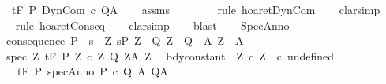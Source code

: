 \begin{isabellebody}
\ \ \ {\isachardoublequoteopen}{\isasymGamma}{\isacharcomma}{\isasymTheta}{\isasymturnstile}\isactrlsub t\isactrlbsub {\isacharslash}F\ \isactrlesub P\ DynCom\ c\ Q{\isacharcomma}A{\isachardoublequoteclose}\isanewline
%
\isadelimproof
\ \ %
\endisadelimproof
%
\isatagproof
{}\isamarkupfalse%
\ assms\isanewline
\ \ \isamarkupfalse%
\ {\isacharminus}\isanewline
\ \ \isamarkupfalse%
\ {\isacharparenleft}rule\ hoaret{\isachardot}DynCom{\isacharparenright}\isanewline
\ \ \isamarkupfalse%
\ clarsimp\isanewline
\ \ \isamarkupfalse%
\ {\isacharparenleft}rule\ hoaret{\isachardot}Conseq{\isacharparenright}\isanewline
\ \ \isamarkupfalse%
\ clarsimp\isanewline
\ \ \isamarkupfalse%
\ blast\isanewline
\ \ \isamarkupfalse%
%
\endisatagproof
{\isafoldproof}%
%
\isadelimproof
\isanewline
%
\endisadelimproof
\isanewline
{}\isamarkupfalse%
\ SpecAnno{\isacharcolon}\ \isanewline
\ \ consequence{\isacharcolon}\ {\isachardoublequoteopen}P\ {\isasymsubseteq}\ {\isacharbraceleft}s{\isachardot}\ {\isacharparenleft}{\isasymexists}\ Z{\isachardot}\ s{\isasymin}P{\isacharprime}\ Z\ {\isasymand}\ {\isacharparenleft}Q{\isacharprime}\ Z\ {\isasymsubseteq}\ Q{\isacharparenright}\ {\isasymand}\ {\isacharparenleft}A{\isacharprime}\ Z\ {\isasymsubseteq}\ A{\isacharparenright}{\isacharparenright}{\isacharbraceright}{\isachardoublequoteclose}\isanewline
\ \ spec{\isacharcolon}\ {\isachardoublequoteopen}{\isasymforall}Z{\isachardot}\ {\isasymGamma}{\isacharcomma}{\isasymTheta}{\isasymturnstile}\isactrlsub t\isactrlbsub {\isacharslash}F\isactrlesub \ {\isacharparenleft}P{\isacharprime}\ Z{\isacharparenright}\ {\isacharparenleft}c\ Z{\isacharparenright}\ {\isacharparenleft}Q{\isacharprime}\ Z{\isacharparenright}{\isacharcomma}{\isacharparenleft}A{\isacharprime}\ Z{\isacharparenright}{\isachardoublequoteclose}\isanewline
\ \ bdy{\isacharunderscore}constant{\isacharcolon}\ \ {\isachardoublequoteopen}{\isasymforall}Z{\isachardot}\ c\ Z\ {\isacharequal}\ c\ undefined{\isachardoublequoteclose}\isanewline
\ \ \ \ {\isachardoublequoteopen}{\isasymGamma}{\isacharcomma}{\isasymTheta}{\isasymturnstile}\isactrlsub t\isactrlbsub {\isacharslash}F\isactrlesub \ P\ {\isacharparenleft}specAnno\ P{\isacharprime}\ c\ Q{\isacharprime}\ A{\isacharprime}{\isacharparenright}\ Q{\isacharcomma}A{\isachardoublequoteclose}\isanewline
%
\isadelimproof
%
\endisadelimproof

\end{isabellebody}
